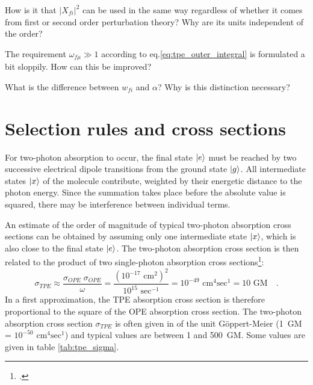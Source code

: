 \begin{questions}

  \item How is it that $|X_{fi}|^2 $ can be used in the same way regardless of whether it comes from first or second order perturbation theory? Why are its units independent of the order?

  \item The requirement $\omega_{f \mu} \gg 1$ according to eq.\ref{eq:tpe_outer_integral} is formulated a bit sloppily. How can this be improved?
  
  \item What is the difference between $w_{fi}$ and $\alpha$? Why is this distinction necessary?
\end{questions}

\section{Selection rules and cross sections}

For two-photon absorption to occur, the final state $\ket{e}$ must be reached by two successive electrical dipole transitions from the ground state $\ket{g}$.   All intermediate states $\ket{x}$ of the molecule contribute, weighted by their energetic distance to the photon energy. Since the summation takes place before the absolute value is squared, there may be interference between individual terms.


An estimate of the order of magnitude of typical two-photon absorption cross sections can be obtained by assuming only one intermediate state $\ket{x}$, which is also close to the final state $\ket{e}$. The two-photon absorption cross section is then related to the product of two single-photon absorption cross sections\footcite{xu97}:
\begin{equation}
\sigma_{TPE} \approx \frac{\sigma_{OPE} \; \sigma_{OPE}}{ \omega}
= \frac{(10^{-17} \text{ cm}^2)^2}{10^{15} \text{ sec}^{-1}} =
10^{-49}\text{ cm}^4\text{sec}^{1} = 10\text{ GM} \quad .
\end{equation}
In a first approximation, the TPE absorption cross section is therefore proportional to the square of the OPE absorption cross section. The two-photon absorption cross section $\sigma_{TPE}$ is often given in of the unit Göppert-Meier (1~GM = $10^{-50}\text{ cm}^4\text{sec}^{1}$) and typical values are between 1 and 500~GM. Some  values are given  in table \ref{tab:tpe_sigma}.



